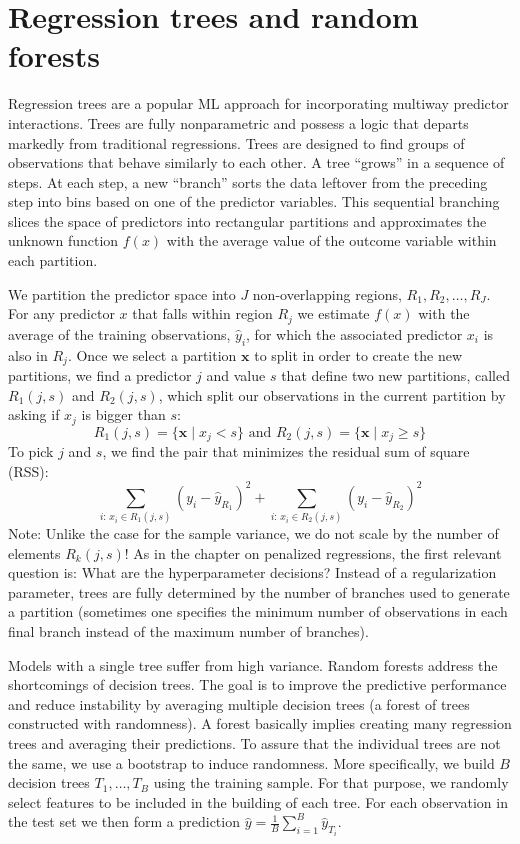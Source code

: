 \documentclass[
]{book}
\begin{document}
\hypertarget{regression-trees-and-random-forests}{%
\section{Regression trees and random forests}\label{regression-trees-and-random-forests}}

Regression trees are a popular ML approach for incorporating multiway predictor interactions. Trees are fully nonparametric and possess a logic that departs markedly from traditional regressions. Trees are designed to find groups of observations that behave similarly to each other. A tree ``grows'' in a sequence of steps. At each step, a new ``branch'' sorts the data leftover from the preceding step into bins based on one of the predictor variables. This sequential branching slices the space of predictors into rectangular partitions and approximates the unknown function \(f(x)\) with the average value of the outcome variable within each partition.

We partition the predictor space into \(J\) non-overlapping regions, \(R_1, R_2, \ldots, R_J\). For any predictor \(x\) that falls within region \(R_j\) we estimate \(f(x)\) with the average of the training observations, \(\hat y_i\), for which the associated predictor \(x_i\) is also in \(R_j\). Once we select a partition \(\mathbf{x}\) to split in order to create the new partitions, we find a predictor \(j\) and value \(s\) that define two new partitions, called \(R_1(j,s)\) and \(R_2(j,s)\), which split our observations in the current partition by asking if \(x_j\) is bigger than \(s\):
\[
R_1(j,s) = \{\mathbf{x} \mid x_j < s\} \mbox{  and  } R_2(j,s) = \{\mathbf{x} \mid x_j \geq s\}
\]
To pick \(j\) and \(s\), we find the pair that minimizes the residual sum of square (RSS):
\[
\sum_{i:\, x_i \in R_1(j,s)} (y_i - \hat{y}_{R_1})^2 +
\sum_{i:\, x_i \in R_2(j,s)} (y_i - \hat{y}_{R_2})^2
\]
Note: Unlike the case for the sample variance, we do not scale by the number of elements \(R_k(j, s)\)! As in the chapter on penalized regressions, the first relevant question is: What are the hyperparameter decisions? Instead of a regularization parameter, trees are fully determined by the number of branches used to generate a partition (sometimes one specifies the minimum number of observations in each final branch instead of the maximum number of branches).

Models with a single tree suffer from high variance. Random forests address the shortcomings of decision trees. The goal is to improve the predictive performance and reduce instability by averaging multiple decision trees (a forest of trees constructed with randomness). A forest basically implies creating many regression trees and averaging their predictions. To assure that the individual trees are not the same, we use a bootstrap to induce randomness. More specifically, we build \(B\) decision trees \(T_1, \ldots, T_B\) using the training sample. For that purpose, we randomly select features to be included in the building of each tree. For each observation in the test set we then form a prediction \(\hat{y} = \frac{1}{B}\sum\limits_{i=1}^B\hat{y}_{T_i}\).
\end{document}
